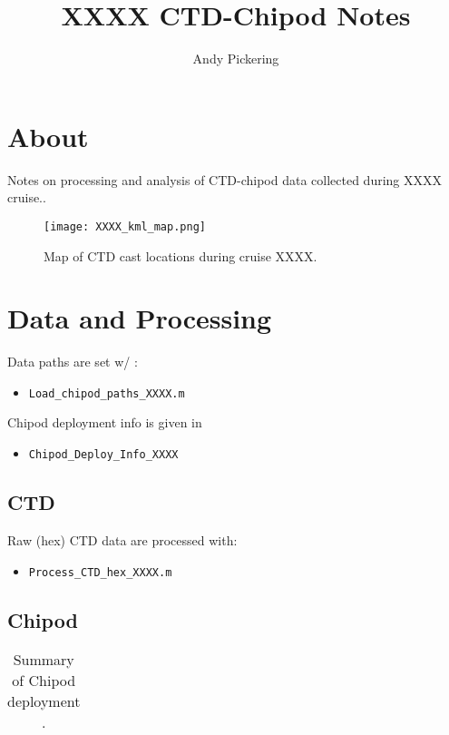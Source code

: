 \documentclass[11pt]{article}
\title{XXXX CTD-Chipod Notes}
\author{Andy Pickering}
\begin{document}
\maketitle

\tableofcontents
\newpage

\section{About}

Notes on processing and analysis of CTD-chipod data collected during XXXX cruise..

\begin{figure}[htbp]
\texttt{[image: XXXX\_kml\_map.png]}
\caption{Map of CTD cast locations during cruise XXXX.}
\label{map}
\end{figure}


\section{Data and Processing}

Data paths are set w/ : 
\begin{itemize}
\item \verb+Load_chipod_paths_XXXX.m+
\end{itemize}

Chipod deployment info is given in 
\begin{itemize}
\item \verb+Chipod_Deploy_Info_XXXX+
\end{itemize}


\subsection{CTD}

Raw (hex) CTD data are processed with:
\begin{itemize}
\item \verb+Process_CTD_hex_XXXX.m+
\end{itemize}

\subsection{Chipod}

\begin{table}[htdp]
\caption{Summary of Chipod deployment .}
\begin{center}
\begin{tabular}{|c|c|c|c|}
\hline
\end{tabular}
\end{center}
\label{default}
\end{table}%
\end{document}
